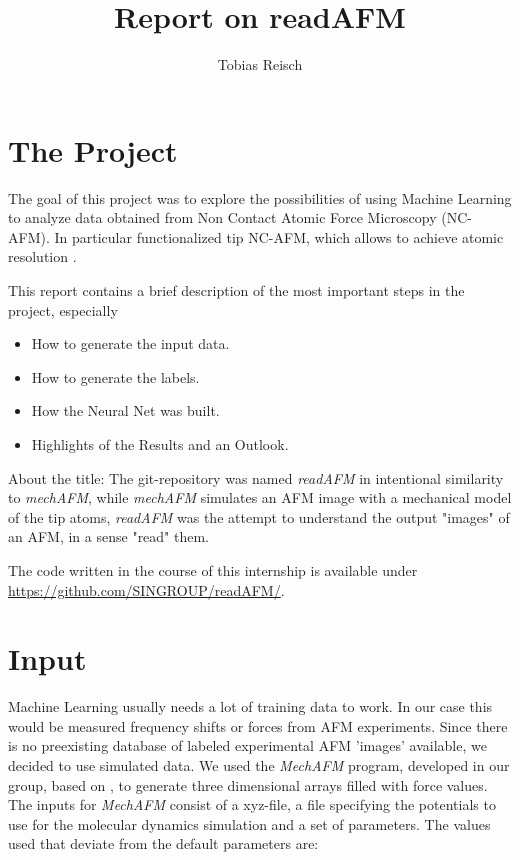 \documentclass{article}
\begin{document}
\author{Tobias Reisch}
\title{Report on readAFM}
\maketitle

\section{The Project}

The goal of this project was to explore the possibilities of using Machine Learning to analyze data obtained from Non Contact Atomic Force Microscopy (NC-AFM). In particular functionalized tip NC-AFM, which allows to achieve atomic resolution \cite{gross2009chemical}.

This report contains a brief description of the most important steps in the project, especially
\begin{itemize}
\item How to generate the input data.
\item How to generate the labels.
\item How the Neural Net was built.
\item Highlights of the Results and an Outlook.
\end{itemize}

About the title: The git-repository was named \emph{readAFM} in intentional similarity to \emph{mechAFM}, while \emph{mechAFM} simulates an AFM image with a mechanical model of the tip atoms, \emph{readAFM} was the attempt to understand the output "images" of an AFM, in a sense "read" them.

The code written in the course of this internship is available under \\ \href{https://github.com/SINGROUP/readAFM/}{https://github.com/SINGROUP/readAFM/}.


\newpage
\section{Input}

Machine Learning usually needs a lot of training data to work. In our case this would be measured frequency shifts or forces from AFM experiments. Since there is no preexisting database of labeled experimental AFM 'images' available, we decided to use simulated data. We used the \emph{MechAFM} program, developed in our group, based on \cite{hapala2014, hamalainen2014}, to generate three dimensional arrays filled with force values. The inputs for \emph{MechAFM} consist of a xyz-file, a file specifying the potentials to use for the molecular dynamics simulation and a set of parameters. The values used that deviate from the default parameters are:
\end{document}
